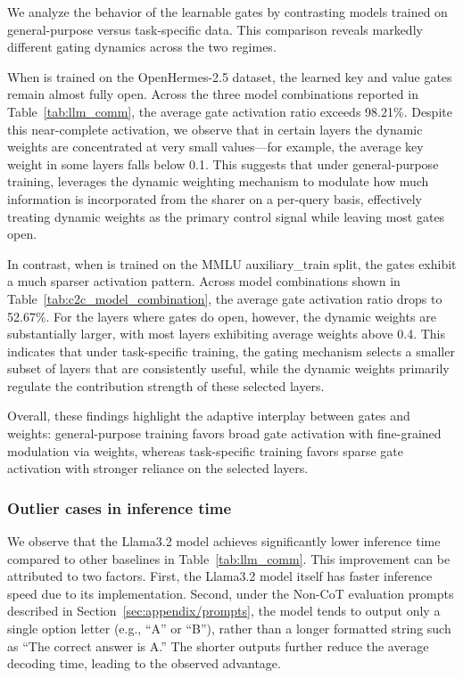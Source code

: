 We analyze the behavior of the learnable gates by contrasting models trained on general-purpose versus task-specific data. This comparison reveals markedly different gating dynamics across the two regimes.  

When \name is trained on the OpenHermes-2.5 dataset, the learned key and value gates remain almost fully open. Across the three model combinations reported in Table~\ref{tab:llm_comm}, the average gate activation ratio exceeds 98.21\%. Despite this near-complete activation, we observe that in certain layers the dynamic weights are concentrated at very small values—for example, the average key weight in some layers falls below 0.1. This suggests that under general-purpose training, \name leverages the dynamic weighting mechanism to modulate how much information is incorporated from the sharer on a per-query basis, effectively treating dynamic weights as the primary control signal while leaving most gates open.  

In contrast, when \name is trained on the MMLU auxiliary\_train split, the gates exhibit a much sparser activation pattern. Across model combinations shown in Table~\ref{tab:c2c_model_combination}, the average gate activation ratio drops to 52.67\%. For the layers where gates do open, however, the dynamic weights are substantially larger, with most layers exhibiting average weights above 0.4. This indicates that under task-specific training, the gating mechanism selects a smaller subset of layers that are consistently useful, while the dynamic weights primarily regulate the contribution strength of these selected layers.  

Overall, these findings highlight the adaptive interplay between gates and weights: general-purpose training favors broad gate activation with fine-grained modulation via weights, whereas task-specific training favors sparse gate activation with stronger reliance on the selected layers.


\subsubsection{Outlier cases in inference time}  
\label{sec:appendix/result/time}

 We observe that the Llama3.2 model achieves significantly lower inference time compared to other baselines in Table~\ref{tab:llm_comm}. This improvement can be attributed to two factors. First, the Llama3.2 model itself has faster inference speed due to its implementation. Second, under the Non-CoT evaluation prompts described in Section~\ref{sec:appendix/prompts}, the model tends to output only a single option letter (e.g., “A” or “B”), rather than a longer formatted string such as “The correct answer is A.” The shorter outputs further reduce the average decoding time, leading to the observed advantage.  

